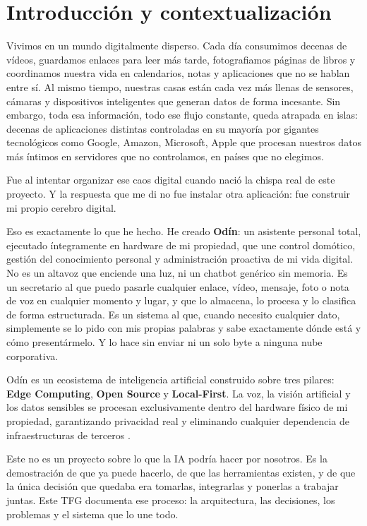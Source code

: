 \chapter{Introducción y contextualización}

Vivimos en un mundo digitalmente disperso. Cada día consumimos decenas de vídeos, guardamos enlaces para leer más tarde, fotografiamos páginas de libros y coordinamos nuestra vida en calendarios, notas y aplicaciones que no se hablan entre sí. Al mismo tiempo, nuestras casas están cada vez más llenas de sensores, cámaras y dispositivos inteligentes que generan datos de forma incesante. Sin embargo, toda esa información, todo ese flujo constante, queda atrapada en islas: decenas de aplicaciones distintas controladas en su mayoría por gigantes tecnológicos como Google, Amazon, Microsoft, Apple que procesan nuestros datos más íntimos en servidores que no controlamos, en países que no elegimos.

Fue al intentar organizar ese caos digital cuando nació la chispa real de este proyecto. Y la respuesta que me di no fue instalar otra aplicación: fue construir mi propio cerebro digital.

Eso es exactamente lo que he hecho. He creado \textbf{Odín}: un asistente personal total, ejecutado íntegramente en hardware de mi propiedad, que une control domótico, gestión del conocimiento personal y administración proactiva de mi vida digital. No es un altavoz que enciende una luz, ni un chatbot genérico sin memoria. Es un secretario al que puedo pasarle cualquier enlace, vídeo, mensaje, foto o nota de voz en cualquier momento y lugar, y que lo almacena, lo procesa y lo clasifica de forma estructurada. Es un sistema al que, cuando necesito cualquier dato, simplemente se lo pido con mis propias palabras y sabe exactamente dónde está y cómo presentármelo. Y lo hace sin enviar ni un solo byte a ninguna nube corporativa.

Odín es un ecosistema de inteligencia artificial construido sobre tres pilares: \textbf{Edge Computing}, \textbf{Open Source} y \textbf{Local-First}. La voz, la visión artificial y los datos sensibles se procesan exclusivamente dentro del hardware físico de mi propiedad, garantizando privacidad real y eliminando cualquier dependencia de infraestructuras de terceros \cite{kleppmann2019localfirst,weiser1991computer,tennenhouse2000proactive}.

Este no es un proyecto sobre lo que la IA podría hacer por nosotros. Es la demostración de que ya puede hacerlo, de que las herramientas existen, y de que la única decisión que quedaba era tomarlas, integrarlas y ponerlas a trabajar juntas. Este TFG documenta ese proceso: la arquitectura, las decisiones, los problemas y el sistema que lo une todo.

